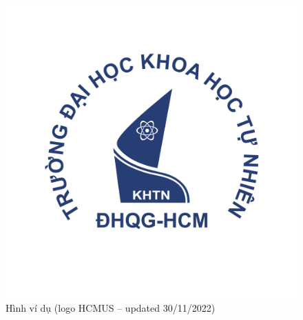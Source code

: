 \begin{figure}[H]
    \centering
    \includegraphics[scale=.4]{img/hcmus-logo.png}
    \caption{Hình ví dụ (logo HCMUS {--} updated 30/11/2022)}\label{fig:my_label_with_H}
\end{figure}